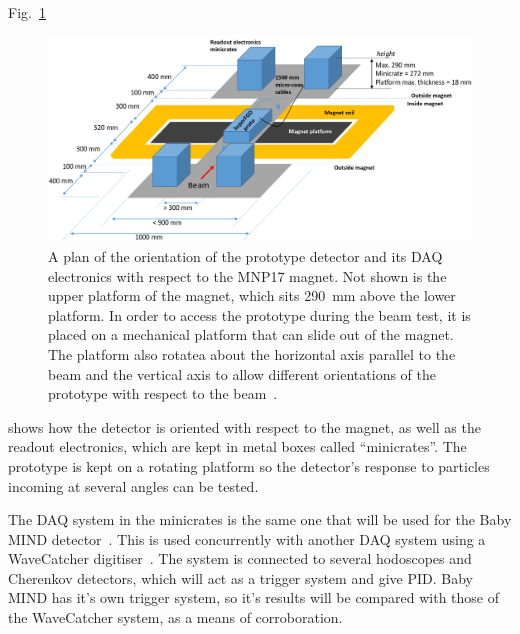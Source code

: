 \documentclass[aps,pra,12pt,notitlepage,tightenlines]{revtex4-1}
\begin{document}
Fig.\ \ref{fig:plat}
\begin{figure}
 \includegraphics[scale=0.4]{platform2}
 \caption{A plan of the orientation of the prototype detector and its DAQ electronics with respect to the MNP17 magnet. Not shown is the upper platform of the magnet, which sits 290~mm above the lower platform. In order to access the prototype during the beam test, it is placed on a mechanical platform that can slide out of the magnet. The platform also rotatea about the horizontal axis parallel to the beam and the vertical axis to allow different orientations of the prototype with respect to the beam~\cite{Cadoux2018}.}
 \label{fig:plat}
\end{figure}
shows how the detector is oriented with respect to the magnet, as well as the readout electronics, which are kept in metal boxes called ``minicrates''. The prototype is kept on a rotating platform so the detector's response to particles incoming at several angles can be tested.

The DAQ system in the minicrates is the same one that will be used for the Baby MIND detector~\cite{Antonova2017}. This is used concurrently with another DAQ system using a WaveCatcher digitiser~\cite{CAEN}. The system is connected to several hodoscopes and Cherenkov detectors, which will act as a trigger system and give PID. Baby MIND has it's own trigger system, so it's results will be compared with those of the WaveCatcher system, as a means of corroboration.
\end{document}

